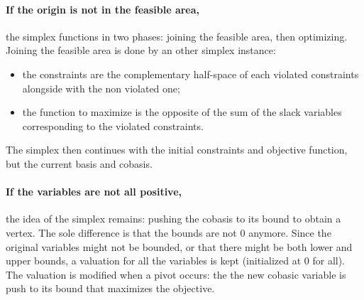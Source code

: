 \paragraph{If the origin is not in the feasible area,} the simplex functions in two phases: joining the feasible area, then optimizing. Joining the feasible area is done by an other simplex instance: 
\vspace*{-0.3cm}
\begin{itemize}
\item the constraints are the complementary half-space of each violated constraints alongside with the non violated one;
\item the function to maximize is the opposite of the sum of the slack variables corresponding to the violated constraints.
\end{itemize}
\vspace*{-0.3cm}
The simplex then continues with the initial constraints and objective function, but the current basis and cobasis.

\paragraph{If the variables are not all positive,} the idea of the simplex remains: pushing the cobasis to its bound to obtain a vertex. The sole difference is that the bounds are not $0$ anymore. Since the original variables might not be bounded, or that there might be both lower and upper bounds, a valuation for all the variables is kept (initialized at $0$ for all). The valuation is modified when a pivot occurs: the the new cobasic variable is push to its bound that maximizes the objective.


